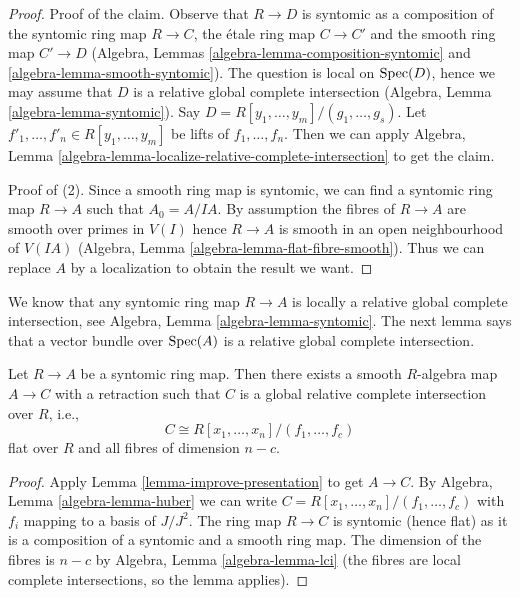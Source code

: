 \begin{proof}
\medskip\noindent
Proof of the claim. Observe that $R \to D$ is syntomic as a composition
of the syntomic ring map $R \to C$, the \'etale ring map $C \to C'$ and the
smooth ring map $C' \to D$ (Algebra, Lemmas
\ref{algebra-lemma-composition-syntomic} and
\ref{algebra-lemma-smooth-syntomic}).
The question is local on $\mathop{\mathrm{Spec}}(D)$, hence we
may assume that $D$ is a relative global complete intersection
(Algebra, Lemma \ref{algebra-lemma-syntomic}).
Say $D = R[y_1, \ldots, y_m]/(g_1, \ldots, g_s)$.
Let $f'_1, \ldots, f'_n \in R[y_1, \ldots, y_m]$ be lifts of
$f_1, \ldots, f_n$. Then we can apply
Algebra, Lemma \ref{algebra-lemma-localize-relative-complete-intersection}
to get the claim.

\medskip\noindent
Proof of (2). Since a smooth ring map is syntomic, we can find
a syntomic ring map $R \to A$ such that $A_0 = A/IA$.
By assumption the fibres of $R \to A$ are smooth over primes in $V(I)$
hence $R \to A$ is smooth in an open neighbourhood of $V(IA)$
(Algebra, Lemma \ref{algebra-lemma-flat-fibre-smooth}).
Thus we can replace $A$ by a localization to obtain the result we want.
\end{proof}

\noindent
We know that any syntomic ring map $R \to A$ is locally a relative global
complete intersection, see
Algebra, Lemma \ref{algebra-lemma-syntomic}.
The next lemma says that a vector bundle over $\mathop{\mathrm{Spec}}(A)$ is
a relative global complete intersection.

\begin{lemma}
\label{lemma-syntomic-complete-intersection}
Let $R \to A$ be a syntomic ring map. Then there exists a smooth $R$-algebra
map $A \to C$ with a retraction such that $C$ is a global relative complete
intersection over $R$, i.e.,
$$
C \cong R[x_1, \ldots, x_n]/(f_1, \ldots, f_c)
$$
flat over $R$ and all fibres of dimension $n - c$.
\end{lemma}

\begin{proof}
Apply Lemma \ref{lemma-improve-presentation} to get $A \to C$.
By Algebra, Lemma \ref{algebra-lemma-huber}
we can write $C = R[x_1, \ldots, x_n]/(f_1, \ldots, f_c)$
with $f_i$ mapping to a basis of $J/J^2$.
The ring map $R \to C$ is syntomic (hence flat)
as it is a composition of a syntomic and a smooth ring map.
The dimension of the fibres is $n - c$ by
Algebra, Lemma \ref{algebra-lemma-lci}
(the fibres are local complete intersections, so the lemma applies).
\end{proof}


